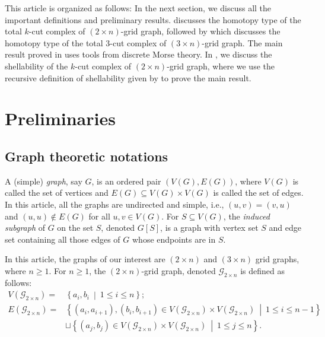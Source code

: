 \documentclass[11pt,reqno,a4paper]{amsart}
\theoremstyle{definition}
\theoremstyle{theorem}
\newcommand{\twogg}{\mathcal{G}_{2\times n}}
\newcommand{\lno}{\left(}
\newcommand{\rno}{\right)}
\newcommand{\lsq}{\left[}
\newcommand{\rsq}{\right]}
\newcommand{\lcu}{\left\{}
\newcommand{\rcu}{\right\}}
\theoremstyle{remark}
\begin{document}
This article is organized as follows: In the next section, we discuss all the important definitions and preliminary results.  discusses the homotopy type of the total $k$-cut complex of $\lno 2 \times n \rno$-grid graph, followed by  which discusses the homotopy type of the total $3$-cut complex of $\lno 3 \times n \rno$-grid graph. The main result proved in  uses tools from discrete Morse theory. In , we discuss the shellability of the $k$-cut complex of $\lno 2 \times n \rno$-grid graph, where we use the recursive definition of shellability given by \cite[Definition~3.25]{jonsson2008simplicial} to prove the main result.



\section{Preliminaries}
\subsection{Graph theoretic notations}
A (simple) \textit{graph}, say $G$, is an ordered pair $\lno V\lno G\rno, E\lno G \rno \rno$, where $V\lno G\rno$ is called the set of vertices and $E\lno G\rno \subseteq V\lno G\rno \times V\lno G\rno$ is called the set of edges. In this article, all the graphs are undirected and simple, i.e., $(u,v)=(v,u)$ and $(u,u)\notin E(G)$ for all $u,v\in V(G)$. For $S\subseteq V\lno G \rno$, the \textit{induced subgraph} of $G$ on the set $S$, denoted $G\lsq S \rsq$, is a graph with vertex set $S$ and edge set containing all those edges of $G$ whose endpoints are in $S$.

In this article, the graphs of our interest are $\lno 2 \times n \rno$ and $\lno 3 \times n\rno$ grid graphs, where $n \geq 1$. For $n\geq 1$, the $\lno 2 \times n \rno$-grid graph, denoted $\twogg$ is defined as follows:
\begin{align*}
    V\lno \twogg\rno = &\lcu a_i, b_i\ \middle|\ 1\leq i \leq n\rcu;\\
    E\lno \twogg\rno = &\lcu \lno a_i, a_{i+1}\rno, \lno b_i, b_{i+1}\rno\in V\lno \twogg\rno\times V\lno \twogg\rno\ \middle|\ 1\leq i \leq n-1\rcu\\& \sqcup \lcu \lno a_j, b_{j}\rno\in V\lno \twogg\rno\times V\lno \twogg\rno\ \middle|\ 1\leq j \leq n\rcu.
\end{align*}
\end{document}
